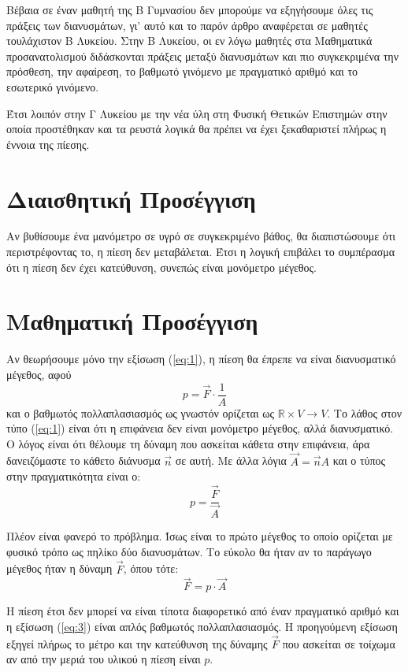 \documentclass[12pt,titlepage]{article}
\begin{document}
Βέβαια σε έναν μαθητή της Β Γυμνασίου δεν μπορούμε να εξηγήσουμε όλες τις πράξεις των διανυσμάτων, γι' αυτό και το παρόν άρθρο αναφέρεται σε μαθητές τουλάχιστον Β Λυκείου. Στην Β Λυκείου, οι εν λόγω μαθητές στα Μαθηματικά προσανατολισμού διδάσκονται πράξεις μεταξύ διανυσμάτων και πιο συγκεκριμένα την πρόσθεση, την αφαίρεση, το βαθμωτό γινόμενο με πραγματικό αριθμό και το εσωτερικό γινόμενο.

Έτσι λοιπόν στην Γ Λυκείου με την νέα ύλη στη Φυσική Θετικών Επιστημών στην οποία προστέθηκαν και τα ρευστά λογικά θα πρέπει να έχει ξεκαθαριστεί πλήρως η έννοια της πίεσης.

\section{Διαισθητική Προσέγγιση}

Αν βυθίσουμε ένα μανόμετρο σε υγρό σε συγκεκριμένο βάθος, θα διαπιστώσουμε ότι περιστρέφοντας το, η πίεση δεν μεταβάλεται. Έτσι η λογική επιβάλει το συμπέρασμα ότι η πίεση δεν έχει κατεύθυνση, συνεπώς είναι μονόμετρο μέγεθος.

\section{Μαθηματική Προσέγγιση}
Αν θεωρήσουμε μόνο την εξίσωση (\ref{eq:1}), η πίεση θα έπρεπε να είναι διανυσματικό μέγεθος, αφού
\begin{equation} \label{eq:4}
 p=\vec{F}\cdot\frac{1}{A}
\end{equation}
και ο βαθμωτός πολλαπλασιασμός ως γνωστόν ορίζεται ως $\mathbb{R} \times V \to V$. Το λάθος στον τύπο (\ref{eq:1}) είναι ότι η επιφάνεια δεν είναι μονόμετρο μέγεθος, αλλά διανυσματικό. Ο λόγος είναι ότι θέλουμε τη δύναμη που ασκείται κάθετα στην επιφάνεια, άρα δανειζόμαστε το κάθετο διάνυσμα $\vec{n}$ σε αυτή. Με άλλα λόγια $\vec{Α}=\vec{n}Α$ και ο τύπος στην πραγματικότητα είναι ο:
\begin{equation} \label{eq:2}
 p=\frac{\vec{F}}{\vec{A}}
\end{equation}

Πλέον είναι φανερό το πρόβλημα. Ίσως είναι το πρώτο μέγεθος το οποίο ορίζεται με φυσικό τρόπο ως πηλίκο δύο διανυσμάτων. Το εύκολο θα ήταν αν το παράγωγο μέγεθος ήταν η δύναμη $\vec{F}$, όπου τότε:
\begin{equation} \label{eq:3}
 \vec{F}=p\cdot \vec{A}
\end{equation}

Η πίεση έτσι δεν μπορεί να είναι τίποτα διαφορετικό από έναν πραγματικό αριθμό και η εξίσωση (\ref{eq:3}) είναι απλός βαθμωτός πολλαπλασιασμός. Η προηγούμενη εξίσωση εξηγεί πλήρως το μέτρο και την κατεύθυνση της δύναμης $\vec{F}$ που ασκείται σε τοίχωμα αν από την μεριά του υλικού η πίεση είναι $p$.
\end{document}
